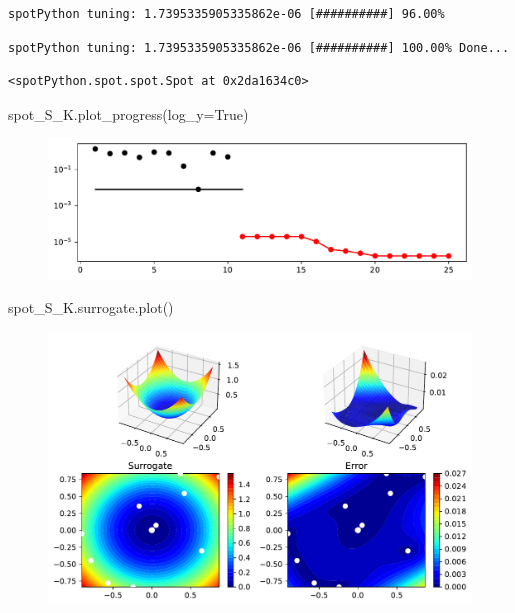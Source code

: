 \documentclass[
  letterpaper,
  DIV=11,
  numbers=noendperiod]{scrreprt}
\newenvironment{Shaded}{\begin{snugshade}}{\end{snugshade}}
\newcommand{\NormalTok}[1]{\textcolor[rgb]{0.00,0.23,0.31}{#1}}
\newcommand{\OperatorTok}[1]{\textcolor[rgb]{0.37,0.37,0.37}{#1}}
\newcommand{\VariableTok}[1]{\textcolor[rgb]{0.07,0.07,0.07}{#1}}
\begin{document}
\begin{verbatim}
spotPython tuning: 1.7395335905335862e-06 [##########] 96.00% 
\end{verbatim}

\begin{verbatim}
spotPython tuning: 1.7395335905335862e-06 [##########] 100.00% Done...
\end{verbatim}

\begin{verbatim}
<spotPython.spot.spot.Spot at 0x2da1634c0>
\end{verbatim}

\begin{Shaded}
\begin{Highlighting}[]
\NormalTok{spot\_S\_K.plot\_progress(log\_y}\OperatorTok{=}\VariableTok{True}\NormalTok{)}
\end{Highlighting}
\end{Shaded}

\begin{figure}[H]

{\centering \includegraphics{07_spot_ei_files/figure-pdf/cell-40-output-1.pdf}

}

\end{figure}

\begin{Shaded}
\begin{Highlighting}[]
\NormalTok{spot\_S\_K.surrogate.plot()}
\end{Highlighting}
\end{Shaded}

\begin{figure}[H]

{\centering \includegraphics{07_spot_ei_files/figure-pdf/cell-41-output-1.pdf}

}

\end{figure}
\end{document}
